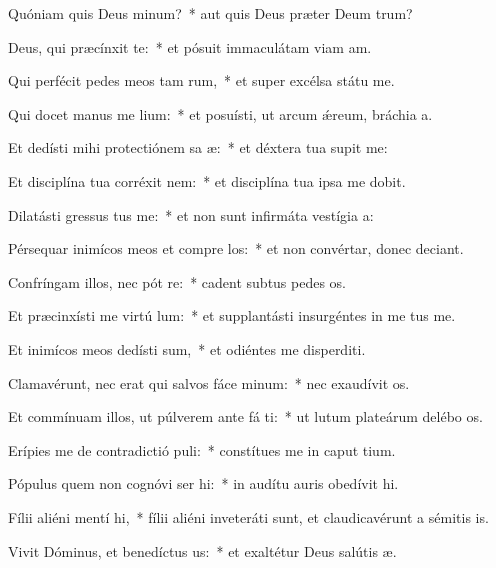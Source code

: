 \item Quóniam quis Deus  minum?~* aut quis Deus præter Deum trum?
\item Deus, qui præcínxit  te:~* et pósuit immaculátam viam am.
\item Qui perfécit pedes meos tam rum,~* et super excélsa státu me.
\item Qui docet manus me  lium:~* et posuísti, ut arcum ǽreum, bráchia a.
\item Et dedísti mihi protectiónem sa æ:~* et déxtera tua supit me:
\item Et disciplína tua corréxit   nem:~* et disciplína tua ipsa me dobit.
\item Dilatásti gressus  tus me:~* et non sunt infirmáta vestígia a:
\item Pérsequar inimícos meos et compre los:~* et non convértar, donec deciant.
\item Confríngam illos, nec pót re:~* cadent subtus pedes os.
\item Et præcinxísti me virtú  lum:~* et supplantásti insurgéntes in me tus me.
\item Et inimícos meos dedísti  sum,~* et odiéntes me disperditi.
\item Clamavérunt, nec erat qui salvos fáce  minum:~* nec exaudívit os.
\item Et commínuam illos, ut púlverem ante fá ti:~* ut lutum plateárum delébo os.
\item Erípies me de contradictió puli:~* constítues me in caput tium.
\item Pópulus quem non cognóvi ser hi:~* in audítu auris obedívit hi.
\item Fílii aliéni mentí  hi,~* fílii aliéni inveteráti sunt, et claudicavérunt a sémitis is.
\item Vivit Dóminus, et benedíctus  us:~* et exaltétur Deus salútis æ.

